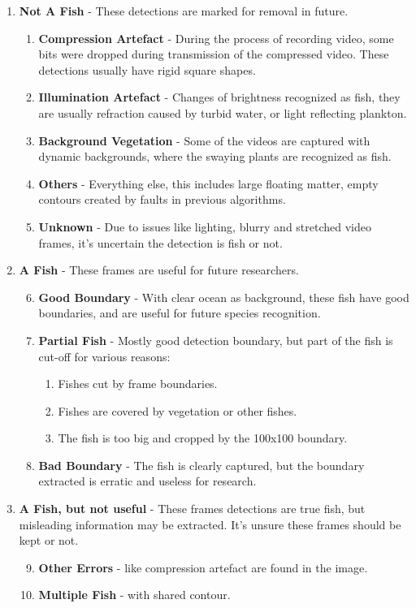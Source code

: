 \documentclass[bsc,logo,twoside,fullspacing,parskip]{infthesis}
\begin{document}
\begin{enumerate}
   \setlength{\parskip}{3pt}

 \item \textbf{Not A Fish} - These detections are marked for removal in future.
 \begin{enumerate}
   \item \textbf{Compression Artefact} - During the process of recording video, some bits were dropped during transmission of the compressed video. These detections usually have rigid square shapes.
   \item \textbf{Illumination Artefact} - Changes of brightness recognized as fish, they are usually refraction caused by turbid water, or light reflecting plankton.
   \item \textbf{Background Vegetation} - Some of the videos are captured with dynamic backgrounds, where the swaying plants are recognized as fish.
   \item \textbf{Others} - Everything else, this includes large floating matter, empty contours created by faults in previous algorithms.
   \item \textbf{Unknown} - Due to issues like lighting, blurry and stretched video frames, it's uncertain the detection is fish or not.
 \end{enumerate}
 
 \item \textbf{A Fish} - These frames are useful for future researchers.
 \begin{enumerate}
   \setcounter{enumii}{5} 
   \item \textbf{Good Boundary} - With clear ocean as background, these fish have good boundaries, and are useful for future species recognition.
   \item \textbf{Partial Fish} - Mostly good detection boundary, but part of the fish is cut-off for various reasons:
    \begin{enumerate}
      \item Fishes cut by frame boundaries.
      \item Fishes are covered by vegetation or other fishes.
      \item The fish is too big and cropped by the 100x100 boundary.
    \end{enumerate}
   \item \textbf{Bad Boundary} - The fish is clearly captured, but the boundary extracted is erratic and useless for research. 
 \end{enumerate}
 
 \item \textbf{A Fish, but not useful} - These frames detections are true fish, but misleading information may be extracted. It's unsure these frames should be kept or not.
 \begin{enumerate}
   \setcounter{enumii}{8} 
   \item \textbf{Other Errors} - like compression artefact are found in the image.
   \item \textbf{Multiple Fish} - with shared contour.
 \end{enumerate}
\end{enumerate}
\end{document}

